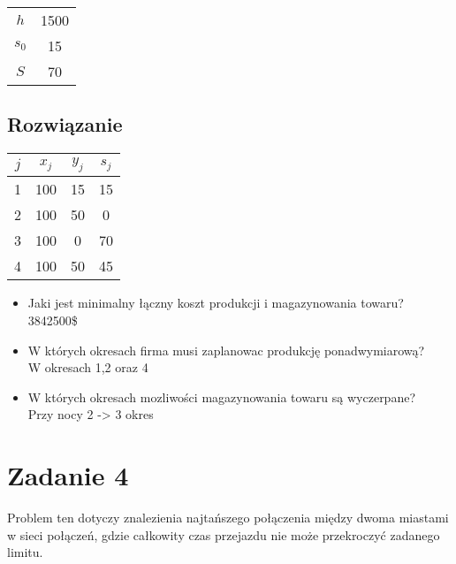 \documentclass[12pt, letterpaper]{article}
\begin{document}
\begin{center}
  \begin{tabular}{|c|c|}
    \hline
    \( h \)   & 1500 \\
    \( s_0 \) & 15   \\
    \( S \)   & 70   \\
    \hline
  \end{tabular}
\end{center}

\subsection{Rozwiązanie}

\begin{center}
  \begin{tabular}{|c|c|c|c|}
    \hline
    \( j \) & \( x_j \) & \( y_j \) & \( s_j \) \\
    \hline
    1       & 100       & 15        & 15        \\
    2       & 100       & 50        & 0         \\
    3       & 100       & 0         & 70        \\
    4       & 100       & 50        & 45        \\
    \hline
  \end{tabular}
\end{center}

\begin{itemize}
  \item Jaki jest minimalny łączny koszt produkcji i magazynowania towaru? \\
        3842500\$
  \item W których okresach firma musi zaplanowac produkcję ponadwymiarową? \\ W
        okresach 1,2 oraz 4
  \item W których okresach mozliwości magazynowania towaru są wyczerpane?  \\
        Przy nocy 2 -> 3 okres
\end{itemize}

\section{Zadanie 4}
Problem ten dotyczy znalezienia najtańszego połączenia między dwoma miastami w
sieci połączeń, gdzie całkowity czas przejazdu nie może przekroczyć zadanego
limitu.
\end{document}
